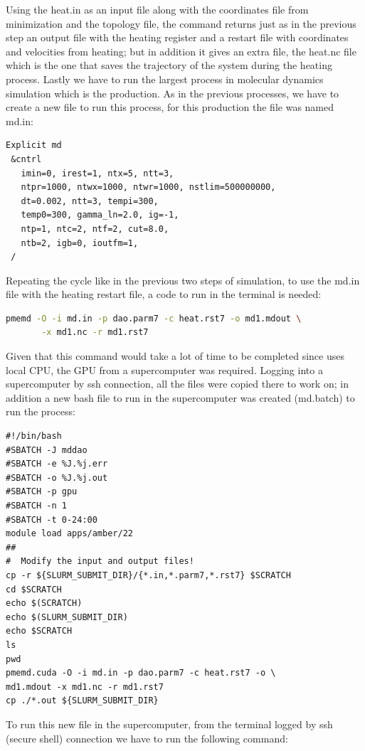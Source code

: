 \documentclass[a4paper]{article}
\begin{document}
Using the heat.in as an input file along with the coordinates file from minimization and the topology file, the command returns just as in the previous step an output file with the heating register and a restart file with coordinates and velocities from heating; but in addition it gives an extra file, the heat.nc file which is the one that saves the trajectory of the system during the heating process.
Lastly we have to run the largest process in molecular dynamics simulation which is the production. As in the previous processes, we have to create a new file to run this process, for this production the file was named md.in:


\begin{verbatim}
Explicit md
 &cntrl
   imin=0, irest=1, ntx=5, ntt=3,
   ntpr=1000, ntwx=1000, ntwr=1000, nstlim=500000000,
   dt=0.002, ntt=3, tempi=300,
   temp0=300, gamma_ln=2.0, ig=-1,
   ntp=1, ntc=2, ntf=2, cut=8.0,
   ntb=2, igb=0, ioutfm=1,
 /

\end{verbatim}

Repeating the cycle like in the previous two steps of simulation, to use the md.in file with the heating restart file, a code to run in the terminal is needed:

\begin{lstlisting}[language=Bash,caption={Heating run}]
    pmemd -O -i md.in -p dao.parm7 -c heat.rst7 -o md1.mdout \
       -x md1.nc -r md1.rst7    
\end{lstlisting}


Given that this command would take a lot of time to be completed since uses local CPU, the GPU from a supercomputer was required. Logging into a supercomputer by ssh connection, all the files were copied there to work on; in addition a new bash file to run in the supercomputer was created (md.batch) to run the process:

\begin{verbatim}
#!/bin/bash
#SBATCH -J mddao
#SBATCH -e %J.%j.err
#SBATCH -o %J.%j.out
#SBATCH -p gpu
#SBATCH -n 1
#SBATCH -t 0-24:00
module load apps/amber/22
##
#  Modify the input and output files!
cp -r ${SLURM_SUBMIT_DIR}/{*.in,*.parm7,*.rst7} $SCRATCH
cd $SCRATCH
echo $(SCRATCH)
echo $(SLURM_SUBMIT_DIR)
echo $SCRATCH
ls
pwd
pmemd.cuda -O -i md.in -p dao.parm7 -c heat.rst7 -o \
md1.mdout -x md1.nc -r md1.rst7
cp ./*.out ${SLURM_SUBMIT_DIR}
\end{verbatim}

To run this new file in the supercomputer, from the terminal logged by ssh (secure shell) connection we have to run the following command:
\end{document}
